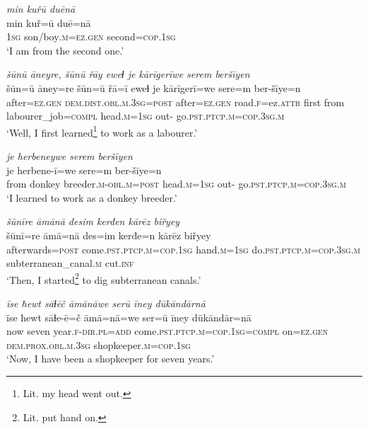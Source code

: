 \ea \label{ŽM.3}
\textit{min kuřū duēnā} \\ 
\gll min kuř=ū duē=nā \\ 
 \textsc{1sg} son/boy\textsc{.m}\textsc{=ez.gen} second\textsc{=cop}\textsc{.\textsc{1sg}} \\ 
\glt `I am from the second one.'
\z 
 
\ea \label{ŽM.4}
\textit{šūnū āneyre, šūnū řāy eweɫ je kārīgerīwe serem beršīyen} \\ 
\gll šūn=ū āney=re šūn=ū řā=ī eweɫ je kārīgerī=we sere=m ber-šīye=n \\ 
 after\textsc{=ez.gen} \textsc{dem.dist}\textsc{.obl}\textsc{.m}\textsc{.3sg}\textsc{=\textsc{post}} after\textsc{=ez.gen} road\textsc{.f}=ez.\textsc{attr} first from labourer\_job\textsc{=compl} head\textsc{.m}\textsc{=\textsc{1sg}} out- go\textsc{.pst}\textsc{.ptcp}\textsc{.m}\textsc{=cop}\textsc{.3sg}\textsc{.m} \\ 
\glt `Well, I first learned\footnote{Lit. my head went out.}  to work as a labourer.'
\z 
 
\ea \label{ŽM.5}
\textit{je herbeneywe serem beršīyen} \\ 
\gll je herbene-ī=we sere=m ber-šīye=n \\ 
 from donkey breeder\textsc{.m}\textsc{-obl}\textsc{.m}\textsc{=\textsc{post}} head\textsc{.m}\textsc{=\textsc{1sg}} out- go\textsc{.pst}\textsc{.ptcp}\textsc{.m}\textsc{=cop}\textsc{.3sg}\textsc{.m} \\ 
\glt `I learned to work as a donkey breeder.'
\z 
 
\ea \label{ŽM.6}
\textit{šūnīre āmānā desim kerđen kārēz biřyey} \\ 
\gll šūnī=re āmā=nā des=im kerđe=n kārēz biřyey \\ 
 afterwards\textsc{=\textsc{post}} come\textsc{.pst}\textsc{.ptcp}\textsc{.m}\textsc{=cop}\textsc{.\textsc{1sg}} hand\textsc{.m}\textsc{=\textsc{1sg}} do\textsc{.pst}\textsc{.ptcp}\textsc{.m}\textsc{=cop}\textsc{.3sg}\textsc{.m} subterranean\_canal\textsc{.m} cut\textsc{.inf} \\ 
\glt `Then, I started\footnote{Lit. put hand on.} to dig subterranean canals.'
\z 
 
\ea \label{ŽM.8}
\textit{īse ħewt sāɫēč āmānāwe serū īney dūkāndārnā} \\ 
\gll īse ħewt sāɫe-ē=č āmā=nā=we ser=ū īney dūkāndār=nā \\ 
 now seven year\textsc{.f}\textsc{-dir}\textsc{.pl}\textsc{=add} come\textsc{.pst}\textsc{.ptcp}\textsc{.m}\textsc{=cop}\textsc{.\textsc{1sg}}\textsc{=compl} on\textsc{=ez.gen} \textsc{dem.prox}\textsc{.obl}\textsc{.m}\textsc{.3sg} shopkeeper\textsc{.m}\textsc{=cop}\textsc{.\textsc{1sg}} \\ 
\glt `Now, I have been a shopkeeper for seven years.'
\z 
 
